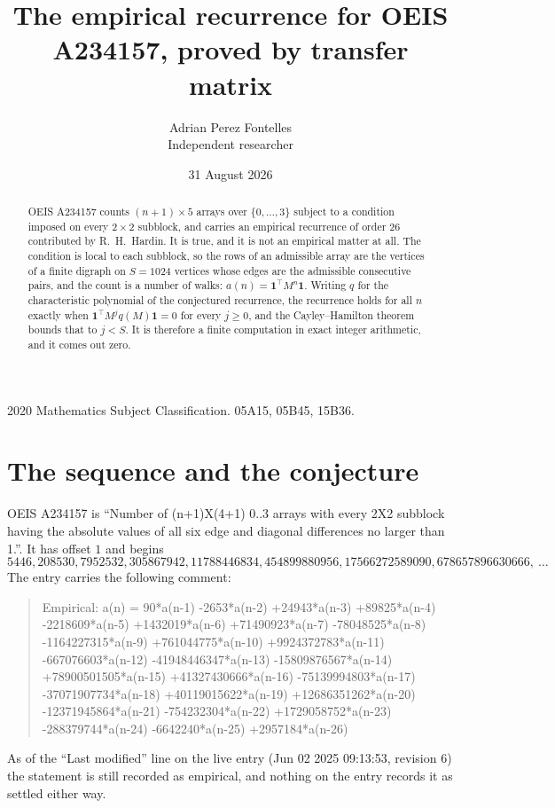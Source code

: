 \documentclass[11pt,a4paper]{article}
\title{The empirical recurrence for OEIS A234157, proved by transfer matrix}
\author{Adrian Perez Fontelles\\ \small Independent researcher}
\date{31 August 2026}
\theoremstyle{plain}
\theoremstyle{definition}
\begin{document}
\maketitle

\begin{abstract}
OEIS A234157 counts $(n+1)\times5$ arrays over $\{0,\dots,3\}$ subject to a condition imposed on
every $2\times2$ subblock, and carries an empirical recurrence of order $26$ contributed
by R.~H.~Hardin. It is true, and it is not an empirical matter at all. The condition is local
to each subblock, so the rows of an admissible array are the vertices of a finite digraph
on $S=1024$ vertices whose edges are the admissible consecutive pairs, and the count is a
number of walks: $a(n)=\mathbf{1}^{\!\top}M^{n}\mathbf{1}$. Writing $q$
for the characteristic polynomial of the conjectured recurrence, the recurrence holds for all
$n$ exactly when $\mathbf{1}^{\!\top}M^{j}q(M)\mathbf{1}=0$ for every $j\ge0$, and the
Cayley--Hamilton theorem bounds that to $j<S$. It is therefore a finite computation in exact
integer arithmetic, and it comes out zero.
\end{abstract}

\noindent\small 2020 Mathematics Subject Classification. 05A15, 05B45, 15B36.\normalsize

\section{The sequence and the conjecture}

OEIS A234157 is ``Number of (n+1)X(4+1) 0..3 arrays with every 2X2 subblock having the absolute values of all six edge and diagonal differences no larger than 1.''. It has offset $1$ and begins
\[
5446, 208530, 7952532, 305867942, 11788446834, 454899880956, 17566272589090, 678657896630666,\ \dots
\]
The entry carries the following comment:
\begin{quote}\small
Empirical: a(n) = 90*a(n-1) -2653*a(n-2) +24943*a(n-3) +89825*a(n-4) -2218609*a(n-5) +1432019*a(n-6) +71490923*a(n-7) -78048525*a(n-8) -1164227315*a(n-9) +761044775*a(n-10) +9924372783*a(n-11) -667076603*a(n-12) -41948446347*a(n-13) -15809876567*a(n-14) +78900501505*a(n-15) +41327430666*a(n-16) -75139994803*a(n-17) -37071907734*a(n-18) +40119015622*a(n-19) +12686351262*a(n-20) -12371945864*a(n-21) -754232304*a(n-22) +1729058752*a(n-23) -288379744*a(n-24) -6642240*a(n-25) +2957184*a(n-26)
\end{quote}
As of the ``Last modified'' line on the live entry (Jun 02 2025 09:13:53, revision 6) the statement is
still recorded as empirical, and nothing on the entry records it as settled either way.
\end{document}
